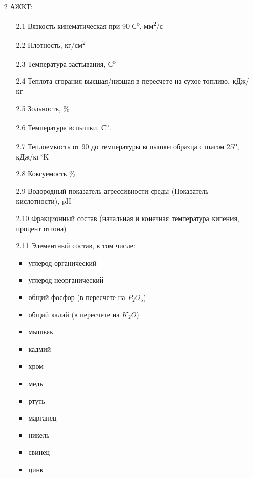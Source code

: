 \documentclass[russian,utf8]{eskdtext}
\begin{document}
\begin{enumerate}
   \item[2] АЖКТ:
      \begin{enumerate}
      \item[2.1] Вязкость кинематическая при 90 С\textsuperscript{o}, мм\textsuperscript{2}/с 
      \item[2.2] Плотность, кг/см\textsuperscript{2}
      \item[2.3] Температура застывания, С\textsuperscript{o}
      \item[2.4] Теплота сгорания высшая/низшая в пересчете на сухое топливо, кДж/кг
      \item[2.5] Зольность, \%
      \item[2.6] Температура вспышки, С\textsuperscript{o}.
      \item[2.7] Теплоемкость от 90 до температуры вспышки образца с шагом 25\textsuperscript{o}, кДж/кг*K
      \item[2.8] Коксуемость \%
      \item[2.9] Водородный показатель агрессивности среды (Показатель кислотности), pH
      \item[2.10] Фракционный состав (начальная и конечная температура кипения, процент отгона)
      \item[2.11] Элементный состав, в том числе:
      \begin{itemize}
            \item углерод органический
            \item углерод неорганический
            \item общий фосфор (в пересчете на  $P_{2}O_{5}$)
            \item общий калий (в пересчете на  $K_{2}O$)
            \item мышьяк  
            \item кадмий
            \item хром 
            \item медь 
            \item ртуть
            \item марганец 
            \item никель 
            \item свинец 
            \item цинк 
      		\end{itemize}
      \end{enumerate}
      

\end{enumerate}
\end{document}
